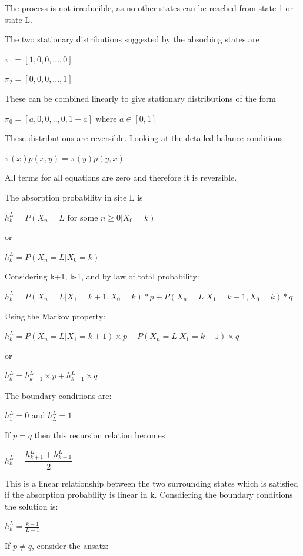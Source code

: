 \documentclass{article}
\begin{document}
\bigskip

The process is not irreducible, as no other states can be reached from state 1 or state L. 

The two stationary distributions suggested by the absorbing states are

$\pi_1 = [1,0,0,...,0]$

$\pi_2 = [0,0,0,...,1]$

These can be combined linearly to give stationary distributions of the form

$\pi_0 = [a,0,0,..,0,1-a] \text{ where } a \in [0,1]$

These distributions are reversible. Looking at the detailed balance conditions:

$\pi(x)p(x,y) = \pi(y)p(y,x)$ 

All terms for all equations are zero and therefore it is reversible.

\bigskip




The absorption probability in site L is 

$h_k^L = P(X_n = L \text{ for some } n \geq 0|X_0 = k)$

or

$h_k^L = P(X_n = L | X_0 = k)$

Considering k+1, k-1, and by law of total probability:

$h_{k}^L = P(X_n = L | X_1 = k+1, X_0 = k) * p + P(X_n = L | X_1 = k-1, X_0 = k) * q $

Using the Markov property:

$h_{k}^L = P(X_n = L | X_1 = k+1) \times p + P(X_n = L | X_1 = k-1) \times q $

or

$h_{k}^L = h_{k+1}^L \times p + h_{k-1}^L \times q $

The boundary conditions are:

$h_{1}^L = 0 \text{ and } h_{L}^L = 1$

\bigskip

If $p=q$ then this recursion relation becomes 

$h_{k}^L = \dfrac{h_{k+1}^L + h_{k-1}^L}{2} $

This is a linear relationship between the two surrounding states which is satisfied if the absorption probability is linear in k. Consdiering the boundary conditions the solution is:

$h_{k}^L = \frac{k-1}{L-1}$

\bigskip

If $p\neq q$, consider the ansatz:
\end{document}
